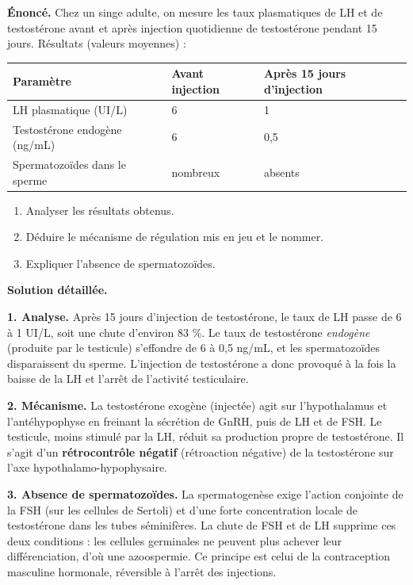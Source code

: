 \documentclass[11pt]{article}
\begin{document}
\begin{exoresolu}
\textbf{Énoncé.} Chez un singe adulte, on mesure les taux plasmatiques de LH et de testostérone avant et après injection quotidienne de testostérone pendant 15 jours. Résultats (valeurs moyennes) :

\begin{center}
\begin{tabularx}{\linewidth}{|l|X|X|}
\hline
\rowcolor{popblueL} \textbf{Paramètre} & \textbf{Avant injection} & \textbf{Après 15 jours d'injection} \\
\hline
LH plasmatique (UI/L) & 6 & 1 \\
\hline
Testostérone endogène (ng/mL) & 6 & 0,5 \\
\hline
Spermatozoïdes dans le sperme & nombreux & absents \\
\hline
\end{tabularx}
\end{center}

\begin{enumerate}
\item Analyser les résultats obtenus.
\item Déduire le mécanisme de régulation mis en jeu et le nommer.
\item Expliquer l'absence de spermatozoïdes.
\end{enumerate}

\tcblower
\textbf{Solution détaillée.}

\textbf{1. Analyse.} Après 15 jours d'injection de testostérone, le taux de LH passe de 6 à 1 UI/L, soit une chute d'environ 83 \%. Le taux de testostérone \emph{endogène} (produite par le testicule) s'effondre de 6 à 0,5 ng/mL, et les spermatozoïdes disparaissent du sperme. L'injection de testostérone a donc provoqué à la fois la baisse de la LH et l'arrêt de l'activité testiculaire.

\textbf{2. Mécanisme.} La testostérone exogène (injectée) agit sur l'hypothalamus et l'antéhypophyse en freinant la sécrétion de GnRH, puis de LH et de FSH. Le testicule, moins stimulé par la LH, réduit sa production propre de testostérone. Il s'agit d'un \textbf{rétrocontrôle négatif} (rétroaction négative) de la testostérone sur l'axe hypothalamo-hypophysaire.

\textbf{3. Absence de spermatozoïdes.} La spermatogenèse exige l'action conjointe de la FSH (sur les cellules de Sertoli) et d'une forte concentration locale de testostérone dans les tubes séminifères. La chute de FSH et de LH supprime ces deux conditions : les cellules germinales ne peuvent plus achever leur différenciation, d'où une azoospermie. Ce principe est celui de la contraception masculine hormonale, réversible à l'arrêt des injections.
\end{exoresolu}
\end{document}
